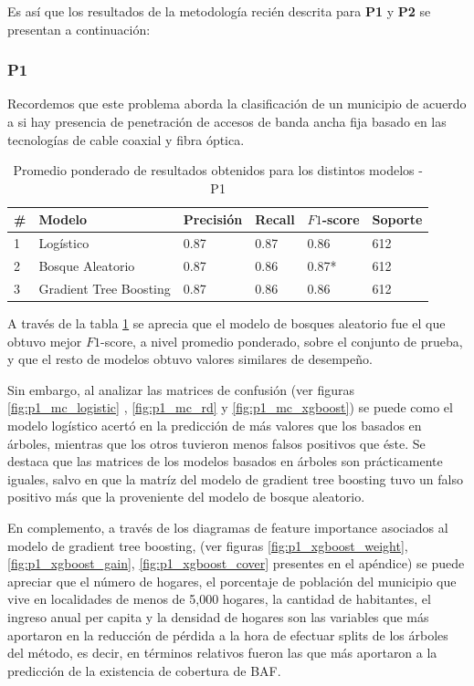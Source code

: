 \documentclass[9pt,twocolumn,twoside]{ilcss}
\begin{document}
Es así que los resultados de la metodología recién descrita para \textbf{P1} y \textbf{P2} se presentan a continuación:

\subsubsection{P1}

Recordemos que este problema aborda la clasificación de un municipio de acuerdo a si hay presencia de penetración de accesos de banda ancha fija basado en las tecnologías de cable coaxial y fibra óptica. 

\begin{table}[tbhp]
	\centering
	\caption{Promedio ponderado de resultados obtenidos para los distintos modelos - P1 }
	\label{tab:p1_results}
	\begin{tabular}{@{}llllll@{}}
		\toprule
		\# & Modelo & Precisión & Recall & $F1$-score & Soporte \\ \midrule
		1 & Logístico & 0.87 & 0.87 & 0.86 & 612 \\
		2 & Bosque Aleatorio & 0.87 & 0.86 & 0.87* & 612 \\
		3 & Gradient Tree Boosting & 0.87 & 0.86 & 0.86 & 612 \\ \bottomrule
	\end{tabular}
\end{table}

A través de la tabla \ref{tab:p1_results} se aprecia que el modelo de bosques aleatorio fue el que obtuvo mejor $F1$-score, a nivel promedio ponderado, sobre el conjunto de prueba, y que el resto de modelos obtuvo valores similares de desempeño.

Sin embargo, al analizar las matrices de confusión (ver figuras \ref{fig:p1_mc_logistic} , \ref{fig:p1_mc_rd} y \ref{fig:p1_mc_xgboost}) se puede como el modelo logístico
acertó en la predicción de más valores que los basados en árboles, mientras que los otros tuvieron menos falsos positivos que éste. Se destaca que las matrices de los modelos basados en árboles son prácticamente iguales, salvo en que la matríz del modelo de gradient tree boosting tuvo un falso positivo más que la proveniente del modelo de bosque aleatorio.

En complemento, a través de los diagramas de feature importance asociados al modelo de gradient tree  boosting, (ver figuras \ref{fig:p1_xgboost_weight}, \ref{fig:p1_xgboost_gain}, \ref{fig:p1_xgboost_cover} presentes en el apéndice) se puede apreciar que el número de hogares, el porcentaje de población del municipio que vive en localidades de menos de 5,000 hogares, la cantidad de habitantes, el ingreso anual per capita y la densidad de hogares son las variables que más aportaron en la reducción de pérdida a la hora de efectuar splits de los árboles del método, es decir, en términos relativos fueron las que más aportaron a la predicción de la existencia de cobertura de BAF.
\end{document}
